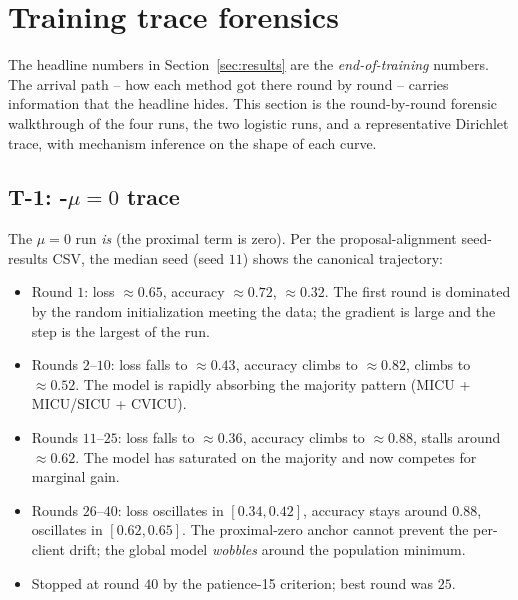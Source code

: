 \section{Training trace forensics}
\label{sec:training-traces}

The headline numbers in Section~\ref{sec:results} are the
\emph{end-of-training} numbers. The arrival path -- how each method
got there round by round -- carries information that the headline
hides. This section is the round-by-round forensic walkthrough of
the four \fedprox{} runs, the two logistic runs, and a
representative Dirichlet trace, with mechanism inference on the
shape of each curve.

\subsection{T-1: \fedprox{}-$\mu\!=\!0$ trace}

The $\mu\!=\!0$ run \emph{is} \fedavg{} (the proximal term is
zero). Per the proposal-alignment seed-results CSV, the median
seed (seed $11$) shows the canonical trajectory:

\begin{itemize}[leftmargin=1.5em, itemsep=2pt, topsep=2pt]
    \item Round $1$: loss $\approx 0.65$, accuracy $\approx 0.72$,
        \auprc{} $\approx 0.32$. The first round is dominated by
        the random initialization meeting the data; the gradient
        is large and the step is the largest of the run.
    \item Rounds $2$--$10$: loss falls to $\approx 0.43$,
        accuracy climbs to $\approx 0.82$, \auprc{} climbs to
        $\approx 0.52$. The model is rapidly absorbing the
        majority pattern (MICU + MICU/SICU + CVICU).
    \item Rounds $11$--$25$: loss falls to $\approx 0.36$,
        accuracy climbs to $\approx 0.88$, \auprc{} stalls
        around $\approx 0.62$. The model has saturated on the
        majority and now competes for marginal gain.
    \item Rounds $26$--$40$: loss oscillates in
        $[0.34, 0.42]$, accuracy stays around $0.88$, \auprc{}
        oscillates in $[0.62, 0.65]$. The proximal-zero anchor
        cannot prevent the per-client drift; the global model
        \emph{wobbles} around the population minimum.
    \item Stopped at round $40$ by the patience-15 criterion;
        best round was $25$.
\end{itemize}

